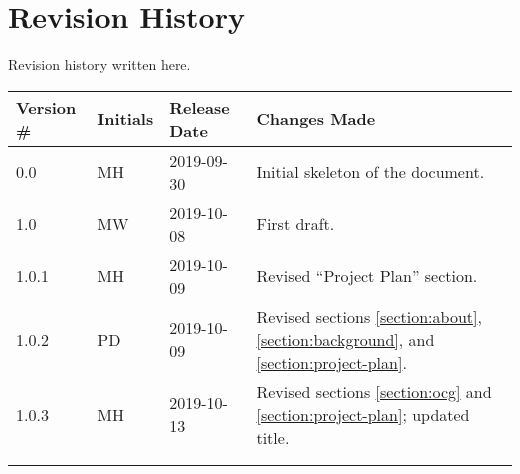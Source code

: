 \thispagestyle{empty}
\section*{Revision History}

Revision history written here.

\begin{table}[H]
\begin{tabular}{llll}
\hline
Version \# & Initials & Release Date & Changes Made \\ \hline
0.0 & MH & 2019-09-30 & Initial skeleton of the document.\\
1.0 & MW & 2019-10-08 & First draft.\\
1.0.1 & MH & 2019-10-09 & Revised ``Project Plan'' section.\\
1.0.2 & PD & 2019-10-09 & Revised sections \ref{section:about}, \ref{section:background}, and \ref{section:project-plan}.\\
1.0.3 & MH & 2019-10-13 & Revised sections \ref{section:ocg} and \ref{section:project-plan}; updated title.\\
 & & & \\
 & & & \\ \hline
\end{tabular}
\end{table}